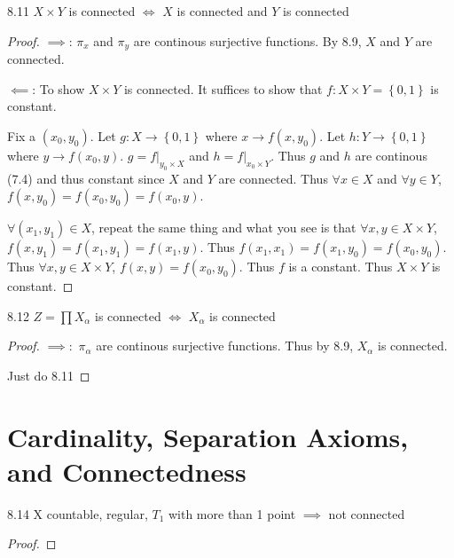 \documentclass{article}
\begin{document}
\begin{claim}{8.11}\label{Claim 8.11.}
    $X \times Y$ is connected $\iff$ $X$ is connected and $Y$ is connected    
\end{claim}
\begin{proof}
    $\implies$: $\pi_x$ and $\pi_y$ are continous surjective functions. By 8.9, $X$ and $Y$ are connected. 
    
    $\impliedby$: To show $X \times Y$ is connected. It suffices to show that $f: X \times Y = \left\{ 0, 1 \right\}$ is constant. 
    
    Fix a $(x_0, y_0)$. Let $g: X \to \left\{ 0, 1 \right\}$ where $x \to f(x, y_0)$. Let $h: Y \to \left\{ 0, 1 \right\}$ where $y \to f(x_0, y)$. $g = f|_{y_0 \times X}$ and $h = f|_{x_0 \times Y}$. Thus $g$ and $h$ are continous (7.4) and thus constant since $X$ and $Y$ are connected. Thus $\forall x \in X$ and $\forall y \in Y$, $f(x, y_0) = f(x_0, y_0) = f(x_0, y)$. 
    
    $\forall (x_1, y_1) \in X$, repeat the same thing and what you see is that $\forall x, y \in X \times Y$, $f(x, y_1) = f(x_1, y_1) = f(x_1, y)$. Thus $f(x_1, x_1) = f(x_1, y_0) = f(x_0, y_0)$. Thus $\forall x, y \in X \times Y$, $f(x, y) = f(x_0, y_0)$. Thus $f$ is a constant. Thus $X \times Y$ is constant.          
\end{proof}

\bigskip

\begin{claim}{8.12}\label{Claim 8.12.}
    $Z = \prod X_\alpha$ is connected $\iff$ $X_\alpha$ is connected   
\end{claim}
\begin{proof}
    $\implies:$ $\pi_\alpha$ are continous surjective functions. Thus by 8.9, $X_\alpha$ is connected. 
    
    
    

    Just do 8.11
\end{proof}

\pagebreak

\section{Cardinality, Separation Axioms, and Connectedness}
\begin{claim}{8.14}\label{Claim 8.14.}
    X countable, regular, $T_1$ with more than 1 point $\implies$ not connected    
\end{claim}
\begin{proof}
\end{proof}
\end{document}
